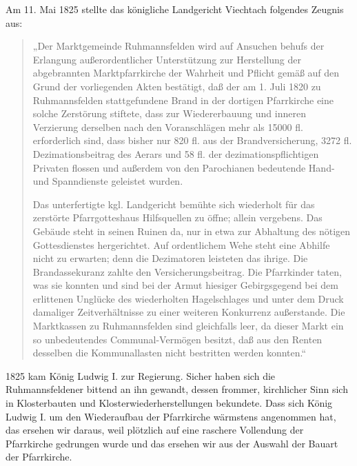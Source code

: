 \documentclass[12pt,a4paper]{book}
\begin{document}
Am 11. Mai 1825 stellte das königliche Landgericht Viechtach folgendes Zeugnis
aus:

\begin{quote}
„Der Marktgemeinde Ruhmannsfelden wird auf Ansuchen behufs der Erlangung
außerordentlicher Unterstützung zur Herstellung der abgebrannten
Marktpfarrkirche der Wahrheit und Pflicht gemäß auf den Grund der vorliegenden
Akten bestätigt, daß der am 1. Juli 1820 zu Ruhmannsfelden stattgefundene Brand
in der dortigen Pfarrkirche eine solche Zerstörung stiftete, dass zur
Wiedererbauung und inneren Verzierung derselben nach den Voranschlägen mehr als
15000 fl. erforderlich sind, dass bisher nur 820 fl. aus der Brandversicherung,
3272 fl. Dezimationsbeitrag des Aerars und 58 fl. der dezimationspflichtigen
Privaten flossen und außerdem von den Parochianen bedeutende Hand- und
Spanndienste geleistet wurden.

Das unterfertigte kgl. Landgericht bemühte sich wiederholt für das zerstörte
Pfarrgotteshaus Hilfsquellen zu öffne; allein vergebens. Das Gebäude steht in
seinen Ruinen da, nur in etwa zur Abhaltung des nötigen Gottesdienstes
hergerichtet. Auf ordentlichem Wehe steht eine Abhilfe nicht zu erwarten; denn
die Dezimatoren leisteten das ihrige. Die Brandassekuranz zahlte den
Versicherungsbeitrag. Die Pfarrkinder taten, was sie konnten und sind bei der
Armut hiesiger Gebirgsgegend bei dem erlittenen Unglücke des wiederholten
Hagelschlages und unter dem Druck damaliger Zeitverhältnisse zu einer weiteren
Konkurrenz außerstande. Die Marktkassen zu Ruhmannsfelden sind gleichfalls leer,
da dieser Markt ein so unbedeutendes Communal-Vermögen besitzt, daß aus den
Renten desselben die Kommunallasten nicht bestritten werden konnten.“
\end{quote}

1825 kam König Ludwig I. zur Regierung. Sicher haben sich die Ruhmannsfeldener
bittend an ihn gewandt, dessen frommer, kirchlicher Sinn sich in Klosterbauten
und Klosterwiederherstellungen bekundete. Dass sich König Ludwig I. um den
Wiederaufbau der Pfarrkirche wärmstens angenommen hat, das ersehen wir daraus,
weil plötzlich auf eine raschere Vollendung der Pfarrkirche gedrungen wurde und
das ersehen wir aus der Auswahl der Bauart der Pfarrkirche.
\end{document}
